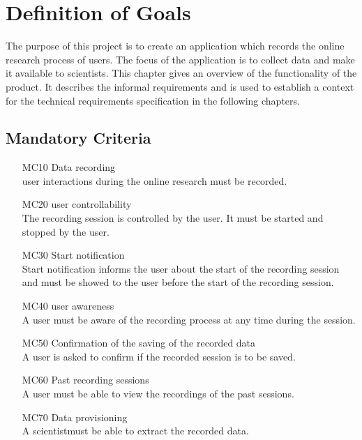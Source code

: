 \chapter{Definition of Goals}
\label{ch:goals}

The purpose of this project is to create an application which records the online research process of \glspl{user}. The focus of the application is to collect data and make it available to \glspl{scientist}. This chapter gives an overview of the functionality of the product. It describes the informal requirements and is used to establish a context for the technical requirements specification in the following chapters.


\section{Mandatory Criteria}

\begin{itemize}
	\item[MC10]Data recording\\\Gls{user} interactions during the online research must be recorded.
	\item[MC20]\Gls{user} controllability\\The recording \gls{session} is controlled by the \gls{user}. It must be started and stopped by the \gls{user}.
	\item[MC30]Start notification\\Start notification informs the \gls{user} about the start of the recording \gls{session} and must be showed to the \gls{user} before the start of the recording \gls{session}. 
	\item[MC40]\Gls{user} awareness\\A \gls{user} must be aware of the recording process at any time during the \gls{session}.
	\item[MC50]Confirmation of the saving of the recorded data\\A \gls{user} is asked to confirm if the recorded \gls{session} is to be saved.
	\item[MC60]Past recording \glspl{session}\\A \gls{user} must be able to view the recordings of the past \glspl{session}.
	\item[MC70]Data provisioning\\A \gls{scientist}must be able to extract the recorded data.
	

\end{itemize}

